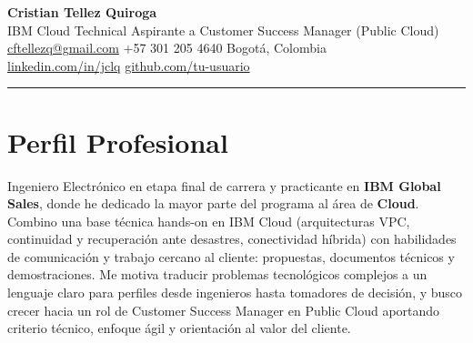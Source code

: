 \documentclass[11pt,a4paper]{article}
\begin{document}
\begin{center}
  {\Huge\bfseries\color{darktext} Cristian Tellez Quiroga}\\[8pt]
  {\large\color{accent} IBM Cloud Technical \textbar{} Aspirante a Customer Success Manager (Public Cloud)}\\[12pt]
  {\small\color{graytext}
    \faEnvelope\hspace{4pt}\href{mailto:cftellezq@gmail.com}{cftellezq@gmail.com}
    \hspace{12pt}
    \faPhone*\hspace{4pt}+57 301 205 4640
    \hspace{12pt}
    \faMapMarker*\hspace{4pt}Bogot\'a, Colombia
  }\\[4pt]
  {\small\color{graytext}
    \faLinkedin\hspace{4pt}\href{https://linkedin.com/in/jclq}{linkedin.com/in/jclq}
    \hspace{12pt}
    \faGithub\hspace{4pt}\href{https://github.com/tu-usuario}{github.com/tu-usuario}
  }
\end{center}

\vspace{-2pt}
\textcolor{accent}{\rule{\linewidth}{2pt}}
\vspace{6pt}

\section{\faUser\hspace{6pt}Perfil Profesional}

Ingeniero Electr\'onico en etapa final de carrera y practicante en \textbf{IBM Global Sales}, donde he dedicado la mayor parte del programa al \'area de \textbf{Cloud}. Combino una base t\'ecnica hands-on en IBM Cloud (arquitecturas VPC, continuidad y recuperaci\'on ante desastres, conectividad h\'ibrida) con habilidades de comunicaci\'on y trabajo cercano al cliente: propuestas, documentos t\'ecnicos y demostraciones. Me motiva traducir problemas tecnol\'ogicos complejos a un lenguaje claro para perfiles desde ingenieros hasta tomadores de decisi\'on, y busco crecer hacia un rol de Customer Success Manager en Public Cloud aportando criterio t\'ecnico, enfoque \'agil y orientaci\'on al valor del cliente.

\end{document}
